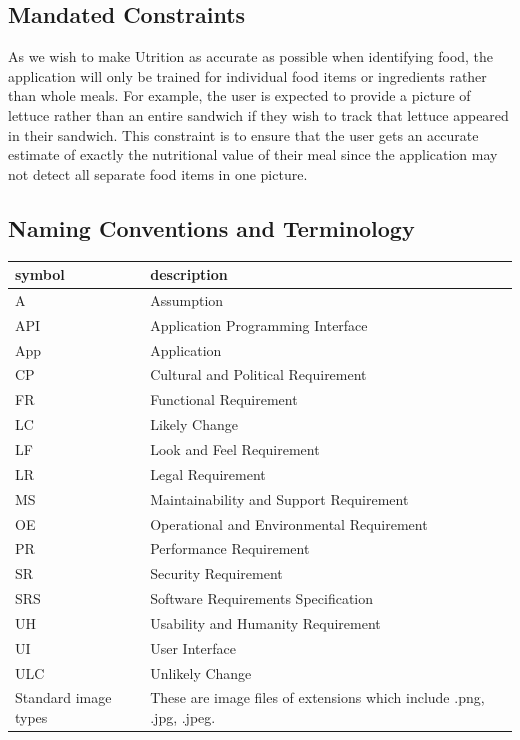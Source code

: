 \documentclass[12pt]{article}
\begin{document}
\subsection{Mandated Constraints} 

As we wish to make Utrition as accurate as possible when identifying food, the application will only be trained for individual food items or ingredients rather than whole meals. For example, the user is expected to provide a picture of lettuce rather than an entire sandwich if they wish to track that lettuce appeared in their sandwich. This constraint is to ensure that the user gets an accurate estimate of exactly the nutritional value of their meal since the application may not detect all separate food items in one picture. 

\subsection{Naming Conventions and Terminology}
\renewcommand{\arraystretch}{1.2}
\begin{tabular}{l l} 
	\toprule		
	\textbf{symbol} & \textbf{description}\\
	\midrule 
	A & Assumption\\
	API & Application Programming Interface\\
	App & Application\\
	CP & Cultural and Political Requirement\\
	FR & Functional Requirement\\
	LC & Likely Change\\
	LF & Look and Feel Requirement\\
	LR & Legal Requirement\\
	MS & Maintainability and Support Requirement\\
	OE & Operational and Environmental Requirement\\
	PR & Performance Requirement\\
	SR & Security Requirement\\
	SRS & Software Requirements Specification\\
	UH & Usability and Humanity Requirement\\
	UI & User Interface\\
	ULC & Unlikely Change\\
	Standard image types & These are image files of extensions which include .png, .jpg, .jpeg. \\
\end{tabular}\\
\end{document}

